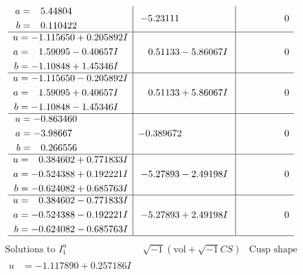 \documentclass[1p]{elsarticle_modified}
\theoremstyle{definition}
\newcommand{\I}{\sqrt{-1}}
\begin{document}
$$\begin{array}{c|c|c}
\begin{aligned}
a &= \phantom{-}5.44804\phantom{ +0.000000I} \\
b &= \phantom{-}0.110422\phantom{ +0.000000I}\end{aligned}
 & -5.23111\phantom{ +0.000000I} & \phantom{-0.000000 } 0 \\ \hline\begin{aligned}
u &= -1.115650 + 0.205892 I \\
a &= \phantom{-}1.59095 - 0.40657 I \\
b &= -1.10848 + 1.45346 I\end{aligned}
 & \phantom{-}0.51133 - 5.86067 I & \phantom{-0.000000 } 0 \\ \hline\begin{aligned}
u &= -1.115650 - 0.205892 I \\
a &= \phantom{-}1.59095 + 0.40657 I \\
b &= -1.10848 - 1.45346 I\end{aligned}
 & \phantom{-}0.51133 + 5.86067 I & \phantom{-0.000000 } 0 \\ \hline\begin{aligned}
u &= -0.863460\phantom{ +0.000000I} \\
a &= -3.98667\phantom{ +0.000000I} \\
b &= \phantom{-}0.266556\phantom{ +0.000000I}\end{aligned}
 & -0.389672\phantom{ +0.000000I} & \phantom{-0.000000 } 0 \\ \hline\begin{aligned}
u &= \phantom{-}0.384602 + 0.771833 I \\
a &= -0.524388 + 0.192221 I \\
b &= -0.624082 + 0.685763 I\end{aligned}
 & -5.27893 - 2.49198 I & \phantom{-0.000000 } 0 \\ \hline\begin{aligned}
u &= \phantom{-}0.384602 - 0.771833 I \\
a &= -0.524388 - 0.192221 I \\
b &= -0.624082 - 0.685763 I\end{aligned}
 & -5.27893 + 2.49198 I & \phantom{-0.000000 } 0\\
 \hline 
 \end{array}$$\newpage$$\begin{array}{c|c|c}  
\text{Solutions to }I^u_{1}& \I (\text{vol} + \sqrt{-1}CS) & \text{Cusp shape}\\
 \hline 
\begin{aligned}
u &= -1.117890 + 0.257186 I \\

\end{aligned}
\end{array}$$
\end{document}
